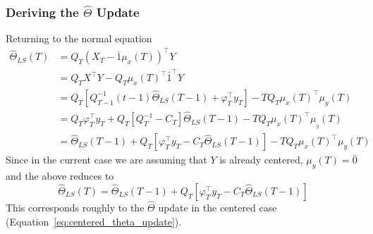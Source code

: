 \subsubsection{Deriving the $\hat\Theta$ Update}
Returning to the normal equation
\begin{align}
  \hat\Theta_{LS}(T) &= Q_T (X_T - \bar{1} \mu_x(T))^\top Y \\
                     &= Q_TX^\top Y - Q_T \mu_x(T)^\top\bar{1}^\top Y \\
                     &= Q_T\left[Q_{T-1}^{-1}(t-1)\hat\Theta_{LS}(T-1) + \varphi_T^\top y_T\right] - TQ_T\mu_x(T)^\top \mu_y(T) \\
                     &= Q_T \varphi_T^\top y_T + Q_T\left[Q_{T}^{-1} - C_T\right]\hat\Theta_{LS}(T-1) - TQ_T\mu_x(T)^\top\mu__y(T) \\
                     &= \hat\Theta_{LS}(T-1) + Q_T\left[\varphi_T^\top y_T - C_T\hat\Theta_{LS}(T-1)\right] - TQ_T\mu_x(T)^\top \mu_y(T) \label{eq:uncentered_x_theta_with_correction}
\end{align}
Since in the current case we are assuming that $Y$ is already centered,
$\mu_y(T) = \bar{0}$ and the above reduces to
\begin{equation}
  \hat\Theta_{LS}(T) = \hat\Theta_{LS}(T-1) + Q_T\left[\varphi_T^\top y_T - C_T\hat\Theta_{LS}(T-1)\right] \label{eq:uncentered_x_theta_update}
\end{equation}
This corresponds roughly to the $\hat\Theta$ update in the centered case (Equation~\ref{eq:centered_theta_update}).

